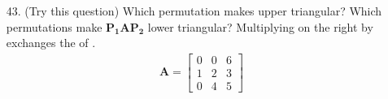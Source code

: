 \begin{itemize}
\begin{itemize}
      \item[43.] (Try this question) Which permutation makes  upper
        triangular? Which permutations make \(\bm{P_1AP_2}\) lower triangular?
        Multiplying  on the right by  exchanges the 
        of .
        \begin{align*}
        \bm{A} =
          \begin{bmatrix}
            0 & 0 & 6 \\
            1 & 2 & 3 \\
            0 & 4 & 5
          \end{bmatrix}
        \end{align*}

    \end{itemize}

\end{itemize}

